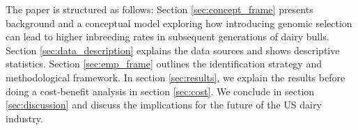 \documentclass[12pt,letterpaper]{article}
\begin{document}

The paper is structured as follows: Section \ref{sec:concept_frame} presents background and a conceptual model exploring how introducing genomic selection can lead to higher inbreeding rates in subsequent generations of dairy bulls. Section \ref{sec:data_description} explains the data sources and shows descriptive statistics. Section \ref{sec:emp_frame} outlines the identification strategy and methodological framework. In section \ref{sec:results}, we explain the results before doing a cost-benefit analysis in section \ref{sec:cost}. We conclude in section \ref{sec:discussion} and discuss the implications for the future of the US dairy industry.


\end{document}

